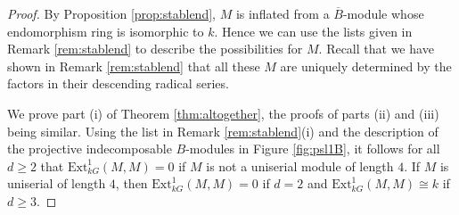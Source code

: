 \documentclass{amsart}
\theoremstyle{plain}
\theoremstyle{definition}
\theoremstyle{remark}
\begin{document}
\begin{proof}
By Proposition \ref{prop:stablend}, $M$ is inflated from a $\overline{B}$-module whose endomorphism 
ring is isomorphic to $k$. Hence we can use
the lists given in Remark \ref{rem:stablend} to describe the possibilities for $M$. Recall that
we have shown in Remark \ref{rem:stablend} that all these $M$ are uniquely determined
by the factors in their descending radical series.

We prove part (i) of Theorem \ref{thm:altogether}, the proofs of parts (ii) and (iii) being similar.
Using the list in Remark \ref{rem:stablend}(i) and the
description of the projective indecomposable $B$-modules in Figure \ref{fig:psl1B},
it follows for all $d\ge 2$
that $\mathrm{Ext}^1_{kG}(M,M)=0$ if $M$ is not a uniserial module of length $4$.
If $M$ is uniserial of length $4$, then $\mathrm{Ext}^1_{kG}(M,M)=0$ if $d=2$ and
$\mathrm{Ext}^1_{kG}(M,M)\cong k$ if $d\ge 3$.


\end{proof}
\end{document}
